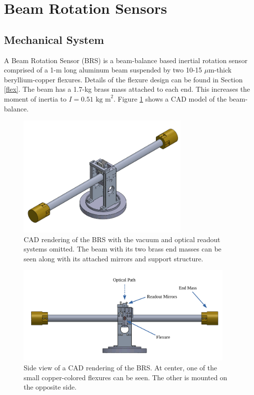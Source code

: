 \documentclass [12pt, proquest]{uwthesis}[2019]
\begin{document}
\section{Beam Rotation Sensors} \label{BRSSec}
\subsection{Mechanical System}

\quad A Beam Rotation Sensor (BRS) is a beam-balance based inertial rotation sensor comprised of a 1-m long aluminum beam suspended by two 10-15 $\mu$m-thick beryllium-copper flexures. Details of the flexure design can be found in Section \ref{flex}. The beam has a 1.7-kg brass mass attached to each end. This increases the moment of inertia to $I=0.51\text{ kg m}^2$. Figure \ref{BRSImage} shows a CAD model of the beam-balance. 

\begin{figure}
\begin{center} \includegraphics[width=0.75\textwidth]{BRSIso.png}
\caption[CAD rendering of the BRS]{CAD rendering of the BRS with the vacuum and optical readout systems omitted. The beam with its two brass end masses can be seen along with its attached mirrors and support structure. }
\end{center}
\end{figure} 
\begin{figure}
\begin{center} 
\includegraphics[width=0.95\textwidth]{BRSFrontLabeled.pdf}
\end{center}
\caption[Side view of a CAD rendering of the BRS]{Side view of a CAD rendering of the BRS. At center, one of the small copper-colored flexures can be seen. The other is mounted on the opposite side.}
\label{BRSImage}
\end{figure}
\end{document}

